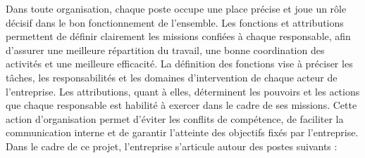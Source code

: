 Dans toute organisation, chaque poste occupe une place précise et joue un rôle décisif dans le bon fonctionnement de l'ensemble. Les fonctions et attributions permettent de définir clairement les missions confiées à chaque responsable, afin d'assurer une meilleure répartition du travail, une bonne coordination des activités et une meilleure efficacité. La définition des fonctions vise à préciser les tâches, les responsabilités et les domaines d'intervention de chaque acteur de l'entreprise. Les attributions, quant à elles, déterminent les pouvoirs et les actions que chaque responsable est habilité à exercer dans le cadre de ses missions. Cette action d'organisation permet d'éviter les conflits de compétence, de faciliter la communication interne et de garantir l'atteinte des objectifs fixés par l'entreprise. Dans le cadre de ce projet, l'entreprise s'articule autour des postes suivants :
